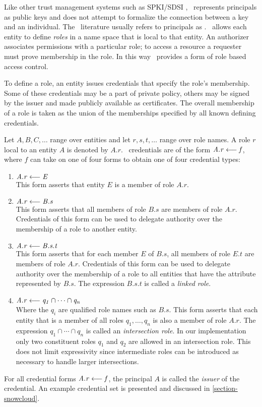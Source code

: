 Like other trust management systems such as SPKI/SDSI \cite{RFC-2693},
\RT\ represents principals as public keys and does not attempt to
formalize the connection between a key and an individual. The
\RT\ literature usually refers to principals as
. \RT\ allows each entity to define \emph{roles} in
a name space that is local to that entity. An authorizer associates
permissions with a particular role; to access a resource a requester
must prove membership in the role. In this way \RT\ provides a form of
role based access control.

To define a role, an entity issues credentials that specify the role's
membership. Some of these credentials may be a part of private policy,
others may be signed by the issuer and made publicly available as
certificates. The overall membership of a role is taken as the union of
the memberships specified by all known defining credentials.

Let $A, B, C, \ldots$ range over entities and let $r, s, t, \ldots$
range over role names. A role $r$ local to an entity $A$ is denoted by
$A.r$. \RT\ credentials are of the form $\mathit{A.r} \stackrel{}{\longleftarrow} \mathit{f}$, where $f$ can
take on one of four forms to obtain one of four credential types:
\begin{enumerate}

\item $\mathit{A.r} \stackrel{}{\longleftarrow} \mathit{E}$ \\
  This form asserts that entity $E$ is a member of role $A.r$.

\item $\mathit{A.r} \stackrel{}{\longleftarrow} \mathit{B.s}$ \\
  This form asserts that all members of role $B.s$ are members of role
  $A.r$. Credentials of this form can be used to delegate authority over
  the membership of a role to another entity.

\item $\mathit{A.r} \stackrel{}{\longleftarrow} \mathit{B.s.t}$ \\
  This form asserts that for each member $E$ of $B.s$, all members of
  role $E.t$ are members of role $A.r$. Credentials of this form can be
  used to delegate authority over the membership of a role to all
  entities that have the attribute represented by $B.s$. The expression
  $B.s.t$ is called a \emph{linked role}.

\item $\mathit{A.r} \stackrel{}{\longleftarrow} \mathit{q_1 \cap \cdots \cap q_n}$ \\
  Where the $q_i$ are qualified role names such as $B.s$. This form
  asserts that each entity that is a member of all roles $q_1,\ldots,
  q_n$ is also a member of role $A.r$. The expression $q_1 \cap \cdots
  \cap q_n$ is called an \emph{intersection role}. In our implementation
  only two constituent roles $q_1$ and $q_2$ are allowed in an
  intersection role. This does not limit expressivity since intermediate
  roles can be introduced as necessary to handle larger intersections.

\end{enumerate}
For all credential forms $\mathit{A.r} \stackrel{}{\longleftarrow} \mathit{f}$, the principal $A$ is called
the \emph{issuer} of the credential. An example credential set is 
presented and discussed in \autoref{section-snowcloud}.

